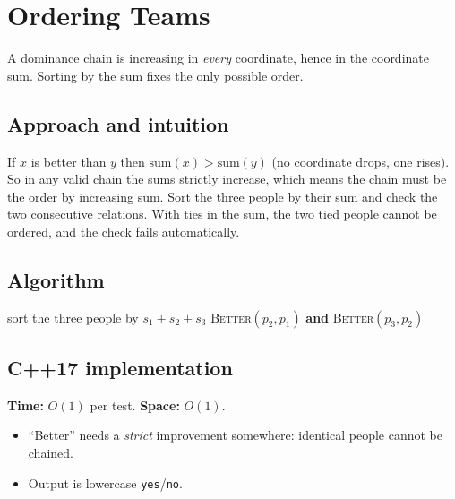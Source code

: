 \section{Ordering Teams}
\label{sec:g-ordering-teams}


\begin{patternbox}
A dominance chain is increasing in \emph{every} coordinate, hence in the
coordinate sum. Sorting by the sum fixes the only possible order.
\end{patternbox}

\subsection*{Approach and intuition}

If $x$ is better than $y$ then $\text{sum}(x)>\text{sum}(y)$ (no coordinate
drops, one rises). So in any valid chain the sums strictly increase, which
means the chain must be the order by increasing sum. Sort the three people by
their sum and check the two consecutive relations. With ties in the sum, the
two tied people cannot be ordered, and the check fails automatically.

\subsection*{Algorithm}
\begin{algorithmic}[1]
\State sort the three people by $s_1+s_2+s_3$
\State \Return \textsc{Better}$(p_2,p_1)$ \textbf{and} \textsc{Better}$(p_3,p_2)$
\end{algorithmic}


\subsection*{C++17 implementation}

\begin{complexitybox}
\textbf{Time:} $O(1)$ per test. \textbf{Space:} $O(1)$.
\end{complexitybox}

\begin{pitfallbox}
\begin{itemize}
  \item ``Better'' needs a \emph{strict} improvement somewhere: identical
        people cannot be chained.
  \item Output is lowercase \texttt{yes}/\texttt{no}.
\end{itemize}
\end{pitfallbox}
